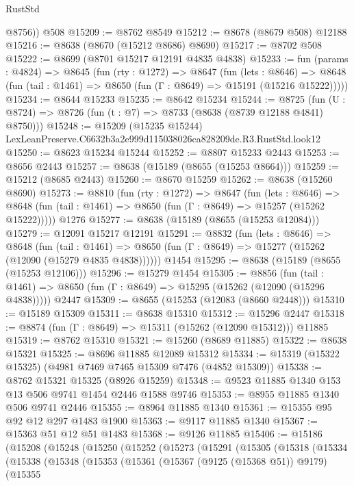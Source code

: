 \begin{lexlean}{RustStd}
\begin{coremodule}
        @8756))
    @508
@15209 := @8762 @8549
@15212 := @8678 (@8679 @508) @12188
@15216 := @8638 (@8670 (@15212 @8686) @8690)
@15217 := @8702 @508
@15222 := @8699 (@8701 @15217 @12191 @4835 @4838)
@15233 := fun (params : @4824) =>
  @8645
    (fun (rty : @1272) =>
    @8647
      (fun (lets : @8646) =>
      @8648 (fun (tail : @1461) => @8650 (fun (Γ : @8649) => @15191 (@15216 @15222)))))
@15234 := @8644 @15233
@15235 := @8642 @15234
@15244 := @8725
    (fun (U : @8724) => @8726 (fun (t : @7) => @8733 (@8638 (@8739 @12188 @4841) @8750)))
@15248 := @15209 (@15235 @15244) LexLeanPreserve.C6632b3a2e999d115038026ca828209de.R3.RustStd.look12
@15250 := @8623 @15234 @15244
@15252 := @8807 @15233 @2443
@15253 := @8656 @2443
@15257 := @8638 (@15189 (@8655 (@15253 @8664)))
@15259 := @15212 (@8685 @2443)
@15260 := @8670 @15259
@15262 := @8638 (@15260 @8690)
@15273 := @8810
    (fun (rty : @1272) =>
    @8647
      (fun (lets : @8646) =>
      @8648 (fun (tail : @1461) => @8650 (fun (Γ : @8649) => @15257 (@15262 @15222)))))
    @1276
@15277 := @8638 (@15189 (@8655 (@15253 @12084)))
@15279 := @12091 @15217 @12191
@15291 := @8832
    (fun (lets : @8646) =>
    @8648
      (fun (tail : @1461) =>
      @8650 (fun (Γ : @8649) => @15277 (@15262 (@12090 (@15279 @4835 @4838))))))
    @1454
@15295 := @8638 (@15189 (@8655 (@15253 @12106)))
@15296 := @15279 @1454
@15305 := @8856
    (fun (tail : @1461) => @8650 (fun (Γ : @8649) => @15295 (@15262 (@12090 (@15296 @4838)))))
    @2447
@15309 := @8655 (@15253 (@12083 (@8660 @2448)))
@15310 := @15189 @15309
@15311 := @8638 @15310
@15312 := @15296 @2447
@15318 := @8874 (fun (Γ : @8649) => @15311 (@15262 (@12090 @15312))) @11885
@15319 := @8762 @15310
@15321 := @15260 (@8689 @11885)
@15322 := @8638 @15321
@15325 := @8696 @11885 @12089 @15312
@15334 := @15319 (@15322 @15325) (@4981 @7469 @7465 @15309 @7476 (@4852 @15309))
@15338 := @8762 @15321 @15325 (@8926 @15259)
@15348 := @9523 @11885 @1340 @153 @13 @506 @9741 @1454 @2446 @1588 @9746
@15353 := @8955 @11885 @1340 @506 @9741 @2446
@15355 := @8964 @11885 @1340
@15361 := @15355 @95 @92 @12 @297 @1483 @1900
@15363 := @9117 @11885 @1340
@15367 := @15363 @51 @12 @51 @1483
@15368 := @9126 @11885
@15406 := @15186
    (@15208
      (@15248
        (@15250
          (@15252
            (@15273
              (@15291
                (@15305
                  (@15318
                    (@15334
                      (@15338
                        (@15348
                          (@15353
                            (@15361
                              (@15367 (@9125 (@15368 @51)) @9179)
                              (@15355

\end{coremodule}
\end{lexlean}
